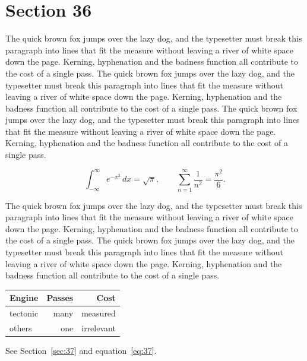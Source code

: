 \documentclass{article}
\begin{document}
\section{Section 36}
\label{sec:36}
The quick brown fox jumps over the lazy dog, and the typesetter must break this paragraph into lines that fit the measure without leaving a river of white space down the page. Kerning, hyphenation and the badness function all contribute to the cost of a single pass. The quick brown fox jumps over the lazy dog, and the typesetter must break this paragraph into lines that fit the measure without leaving a river of white space down the page. Kerning, hyphenation and the badness function all contribute to the cost of a single pass. The quick brown fox jumps over the lazy dog, and the typesetter must break this paragraph into lines that fit the measure without leaving a river of white space down the page. Kerning, hyphenation and the badness function all contribute to the cost of a single pass. 

\begin{equation}\label{eq:36}
\int_{-\infty}^{\infty} e^{-x^{2}}\,dx = \sqrt{\pi}, \qquad
\sum_{n=1}^{\infty} \frac{1}{n^{2}} = \frac{\pi^{2}}{6}.
\end{equation}

The quick brown fox jumps over the lazy dog, and the typesetter must break this paragraph into lines that fit the measure without leaving a river of white space down the page. Kerning, hyphenation and the badness function all contribute to the cost of a single pass. The quick brown fox jumps over the lazy dog, and the typesetter must break this paragraph into lines that fit the measure without leaving a river of white space down the page. Kerning, hyphenation and the badness function all contribute to the cost of a single pass. 

\begin{center}
\begin{tabular}{lrr}
\toprule
Engine & Passes & Cost \\
\midrule
tectonic & many & measured \\
others & one & irrelevant \\
\bottomrule
\end{tabular}
\end{center}

See Section~\ref{sec:37} and equation~\eqref{eq:37}.
\end{document}
